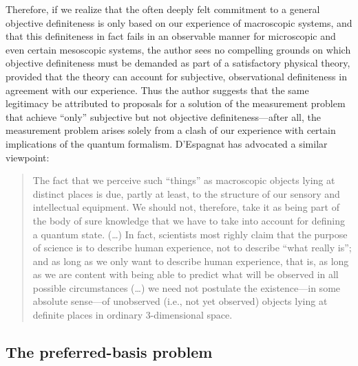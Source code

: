 \documentclass[twocolumn,rmp,aps,amsmath,amsfonts,noshowkeys,noshowpacs]{revtex4}
\begin{document}
Therefore, if we realize that the often deeply felt commitment to a
general objective definiteness is only based on our experience of
macroscopic systems, and that this definiteness in fact fails in an
observable manner for microscopic and even certain mesoscopic systems,
the author sees no compelling grounds on which objective definiteness
must be demanded as part of a satisfactory physical theory, provided
that the theory can account for subjective, observational definiteness
in agreement with our experience. Thus the author suggests that the
same legitimacy be attributed to proposals for a solution of the
measurement problem that achieve ``only'' subjective but not objective
definiteness---after all, the measurement problem arises solely from a
clash of our experience with certain implications of the quantum
formalism.  D'Espagnat \citeyearpar[pp.~134--135]{Espagnat:2000:uy}
has advocated a similar viewpoint:
%
\begin{quote} {\small 
    The fact that we perceive such ``things'' as macroscopic objects
    lying at distinct places is due, partly at least, to the structure
    of our sensory and intellectual equipment.  We should not,
    therefore, take it as being part of the body of sure knowledge
    that we have to take into account for defining a quantum state.
    (\dots) In fact, scientists most righly claim that the purpose of
    science is to describe human experience, not to describe ``what
    really is''; and as long as we only want to describe human
    experience, that is, as long as we are content with being able to
    predict what will be observed in all possible circumstances
    (\dots) we need not postulate the existence---in some absolute
    sense---of unobserved (i.e., not yet observed) objects lying at
    definite places in ordinary 3-dimensional space.}
\end{quote}



\subsection{The preferred-basis problem \label{sec:pbprob}}
\end{document}
